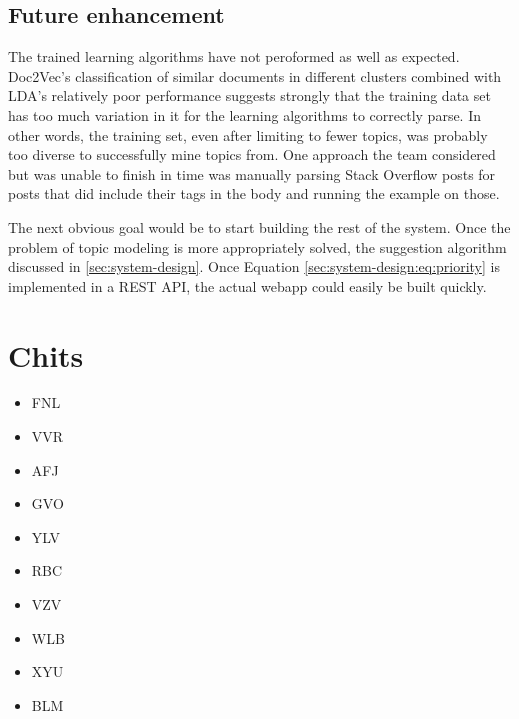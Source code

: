 \subsection{Future enhancement}
The trained learning algorithms have not peroformed as well as
expected. Doc2Vec's classification of similar documents in different clusters combined with LDA's relatively poor performance suggests strongly that the training data set has too much variation in it for the learning algorithms to correctly parse.  In other words, the training set, even after limiting to fewer topics, was probably too diverse to successfully mine topics from. One approach the team considered but was unable to finish in time was manually parsing Stack Overflow posts for posts that did include their tags in the body and running the example on those.  

The next obvious goal would be to start building the rest of the system. Once the problem of topic modeling is more appropriately solved, the suggestion algorithm discussed in \ref{sec:system-design}. Once Equation \ref{sec:system-design:eq:priority} is implemented in a REST API, the actual webapp could easily be built quickly.  

\section{Chits}
\begin{itemize}
\item FNL
\item VVR
\item AFJ
\item GVO
\item YLV
\item RBC
\item VZV
\item WLB
\item XYU
\item BLM
\end{itemize}


 